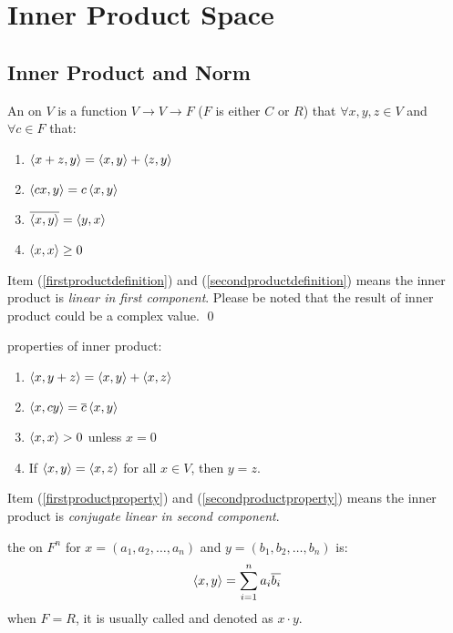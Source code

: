 \section{Inner Product Space}


\subsection{Inner Product and Norm}

\begin{definition}
	An  on $V$ is a function $V \rightarrow V \rightarrow F$ ($F$ is either $C$ or $R$) that $\forall x,y,z \in V$ and $\forall c \in F$ that:
	\begin{enumerate}
		\item $\left\langle \displaystyle x+z, y \right\rangle = \left\langle \displaystyle x, y \right\rangle + \left\langle \displaystyle z, y \right\rangle$ \label{firstproductdefinition}
		\item $\left\langle \displaystyle cx, y \right\rangle = c \left\langle \displaystyle x, y \right\rangle$ \label{secondproductdefinition}
		\item $\overline{\left\langle \displaystyle x, y \right\rangle} = \left\langle \displaystyle y, x \right\rangle$
		\item $\left\langle \displaystyle x, x \right\rangle \geq 0$
	\end{enumerate}
	Item (\ref{firstproductdefinition}) and (\ref{secondproductdefinition}) means the inner product is \emph{linear in first component}.
	Please be noted that the result of inner product could be a complex value.
	\qed
\end{definition}


\begin{theorem}
	properties of inner product:
	\begin{enumerate}
		\item $\left\langle \displaystyle x, y+z \right\rangle = \left\langle \displaystyle x, y \right\rangle + \left\langle \displaystyle x, z \right\rangle$ \label{firstproductproperty}
		\item $\left\langle \displaystyle x, cy \right\rangle = \overline{c} \left\langle \displaystyle x, y \right\rangle $ \label{secondproductproperty}
		\item $\left\langle \displaystyle x, x \right\rangle > 0$ unless $x=0$
		\item If $\left\langle \displaystyle x, y \right\rangle = \left\langle \displaystyle x, z \right\rangle$ for all $x \in V$, then $y=z$.
	\end{enumerate}
	Item (\ref{firstproductproperty}) and (\ref{secondproductproperty}) means the inner product is \emph{conjugate linear in second component}.
\end{theorem}


\begin{definition}
	the  on $F^n$ for $x=(a_1,a_2,\dots,a_n)$ and $y=(b_1,b_2,\dots,b_n)$ is:
	\begin{equation}
		\left\langle \displaystyle x, y \right\rangle = \sum_{i=1}^n a_i \overline{b_i}		
	\end{equation}
	when $F=R$, it is usually called  and denoted as $x \cdot y$.
\end{definition}


